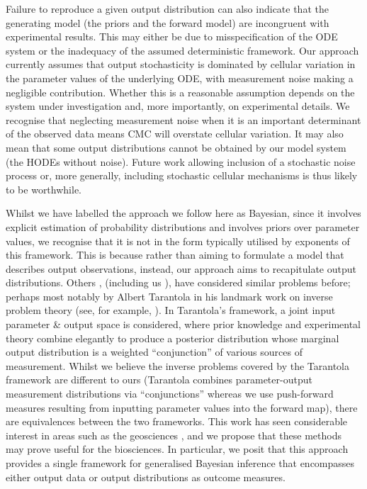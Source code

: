 Failure to reproduce a given output distribution can also indicate that the generating model (the priors and the forward model) are incongruent with experimental results. This may either be due to misspecification of the ODE system or the inadequacy of the assumed deterministic framework. Our approach currently assumes that output stochasticity is dominated by cellular variation in the parameter values of the underlying ODE, with measurement noise making a negligible contribution. Whether this is a reasonable assumption depends on the system under investigation and, more importantly, on experimental details. We recognise that neglecting measurement noise when it is an important determinant of the observed data means CMC will overstate cellular variation. It may also mean that some output distributions cannot be obtained by our model system (the HODEs without noise). Future work allowing inclusion of a stochastic noise process or, more generally, including stochastic cellular mechanisms is thus likely to be worthwhile.

Whilst we have labelled the approach we follow here as Bayesian, since it involves explicit estimation of probability distributions and involves priors over parameter values, we recognise that it is not in the form typically utilised by exponents of this framework. This is because rather than aiming to formulate a model that describes output observations, instead, our approach aims to recapitulate output distributions. Others \cite{BJW-18}, (including us \cite{lambert2018inverse}), have considered similar problems before; perhaps most notably by Albert Tarantola in his landmark work on inverse problem theory (see, for example, \cite{tarantola2005inverse}). In Tarantola's framework, a joint input parameter \& output space is considered, where prior knowledge and experimental theory combine elegantly to produce a posterior distribution whose marginal output distribution is a weighted ``conjunction'' of various sources of measurement. Whilst we believe the inverse problems covered by the Tarantola framework are different to ours (Tarantola combines parameter-output measurement distributions via ``conjunctions'' whereas we use push-forward measures resulting from inputting parameter values into the forward map), there are equivalences between the two frameworks. This work has seen considerable interest in areas such as the geosciences \cite{mosegaard1995monte,vukicevic2008analysis}, and we propose that these methods may prove useful for the biosciences. In particular, we posit that this approach provides a single framework for generalised Bayesian inference that encompasses either output data or output distributions as outcome measures.

